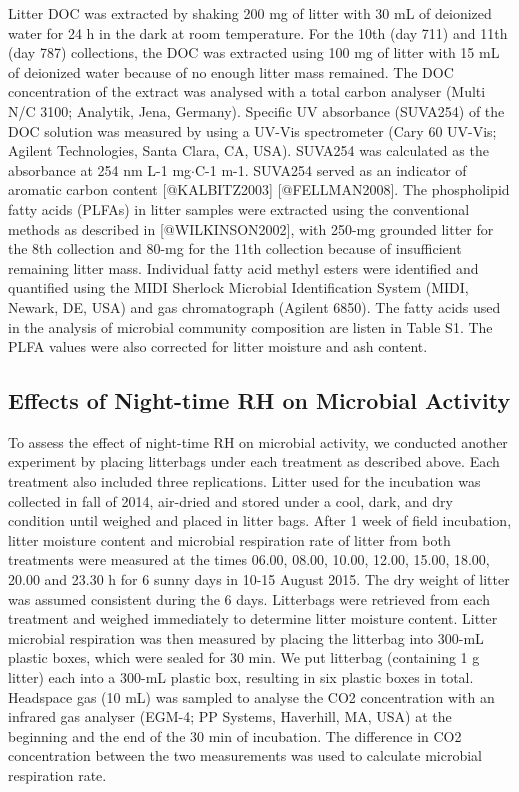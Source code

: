 \documentclass[
]{article}
\begin{document}
Litter DOC was extracted by shaking 200 mg of litter with 30 mL of
deionized water for 24 h in the dark at room temperature. For the 10th
(day 711) and 11th (day 787) collections, the DOC was extracted using
100 mg of litter with 15 mL of deionized water because of no enough
litter mass remained. The DOC concentration of the extract was analysed
with a total carbon analyser (Multi N/C 3100; Analytik, Jena, Germany).
Speciﬁc UV absorbance (SUVA254) of the DOC solution was measured by
using a UV-Vis spectrometer (Cary 60 UV-Vis; Agilent Technologies, Santa
Clara, CA, USA). SUVA254 was calculated as the absorbance at 254 nm L-1
mg\(\cdot\)C-1 m-1. SUVA254 served as an indicator of aromatic carbon
content {[}@KALBITZ2003{]} {[}@FELLMAN2008{]}. The phospholipid fatty
acids (PLFAs) in litter samples were extracted using the conventional
methods as described in {[}@WILKINSON2002{]}, with 250-mg grounded
litter for the 8th collection and 80-mg for the 11th collection because
of insufficient remaining litter mass. Individual fatty acid methyl
esters were identiﬁed and quantiﬁed using the MIDI Sherlock Microbial
Identiﬁcation System (MIDI, Newark, DE, USA) and gas chromatograph
(Agilent 6850). The fatty acids used in the analysis of microbial
community composition are listen in Table S1. The PLFA values were also
corrected for litter moisture and ash content.

\subsection{Effects of Night-time RH on Microbial
Activity}\label{effects-of-night-time-rh-on-microbial-activity}

To assess the effect of night-time RH on microbial activity, we
conducted another experiment by placing litterbags under each treatment
as described above. Each treatment also included three replications.
Litter used for the incubation was collected in fall of 2014, air-dried
and stored under a cool, dark, and dry condition until weighed and
placed in litter bags. After 1 week of field incubation, litter moisture
content and microbial respiration rate of litter from both treatments
were measured at the times 06.00, 08.00, 10.00, 12.00, 15.00, 18.00,
20.00 and 23.30 h for 6 sunny days in 10-15 August 2015. The dry weight
of litter was assumed consistent during the 6 days. Litterbags were
retrieved from each treatment and weighed immediately to determine
litter moisture content. Litter microbial respiration was then measured
by placing the litterbag into 300-mL plastic boxes, which were sealed
for 30 min. We put litterbag (containing 1 g litter) each into a 300-mL
plastic box, resulting in six plastic boxes in total. Headspace gas (10
mL) was sampled to analyse the CO2 concentration with an infrared gas
analyser (EGM-4; PP Systems, Haverhill, MA, USA) at the beginning and
the end of the 30 min of incubation. The difference in CO2 concentration
between the two measurements was used to calculate microbial respiration
rate.
\end{document}
